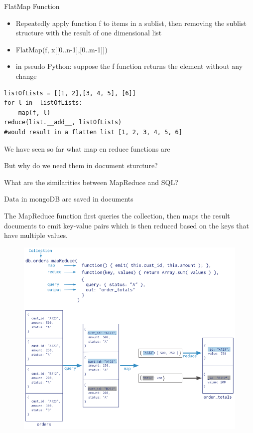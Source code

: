 \documentclass{beamer}
\begin{document}
\begin{frame}[fragile]{FlatMap Function}
\begin{itemize}
\item Repeatedly apply function f to items in a sublist, then removing the sublist structure with the result of one dimensional list
\item FlatMap(f, x[[0..n-1],[0..m-1]])
\item in pseudo Python: suppose the f function returns the element without any change\\
\end{itemize}
\begin{lstlisting}
listOfLists = [[1, 2],[3, 4, 5], [6]]
for l in  listOfLists:
	map(f, l)
reduce(list.__add__, listOfLists)
#would result in a flatten list [1, 2, 3, 4, 5, 6]
\end{lstlisting}
\end{frame}

\begin{slide}{
\item We have seen so far what map en reduce functions are
\item But why do we need them in document sturcture?
\item What are the similarities between MapReduce and SQL?
}\end{slide}

\begin{slide}{
\item Data in mongoDB are saved in documents
\item The MapReduce function first queries the collection, then maps the result documents to emit key-value pairs which is then reduced based on the keys that have multiple values.
\begin{figure}
		\includegraphics[scale=0.26]{img/map-reduce}
\end{figure}
}\end{slide}
\end{document}
